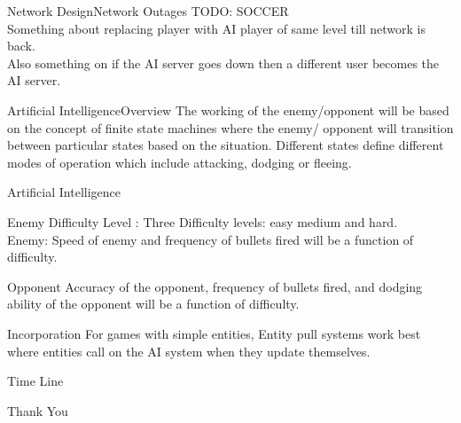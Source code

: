 \documentclass{beamer}
\begin{document}
\begin{frame}{Network Design}{Network Outages}
	TODO: SOCCER \\
	Something about replacing player with AI player of same level till network is back. \\
	Also something on if the AI server goes down then a different user becomes the AI server.
\end{frame}

\begin{frame}{Artificial Intelligence}{Overview}
  The working of the enemy/opponent will be based on the concept of finite state machines where the enemy/ opponent will transition between particular states based on the situation. Different states define different modes of operation which include attacking, dodging or fleeing.
\end{frame}

\begin{frame}{Artificial Intelligence}{}
	\begin{block}{Enemy}
  			Difficulty Level : Three Difficulty levels: easy medium and hard. \\
			Enemy: Speed of enemy and frequency of bullets fired will be a function of difficulty.
 	\end{block}
	\begin{block}{Opponent} 
  			Accuracy of the opponent, frequency of bullets fired, and dodging ability of the opponent will be a function of difficulty.
	\end{block}
	\begin{block}{Incorporation}
		For games with simple entities, Entity pull systems work best where entities call on the AI system when they update themselves.
	\end{block}
\end{frame}

\begin{frame}{Time Line}{}
	  
\end{frame}

\begin{frame}
	\vfill
	\begin{center}
		\huge{Thank You}
	\end{center}
	\vfill
\end{frame}
\end{document}
